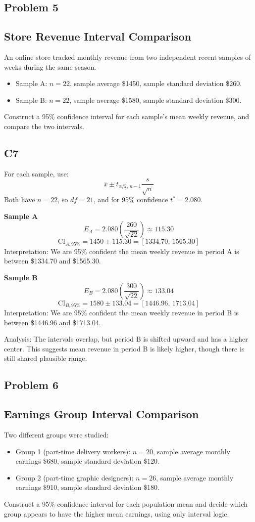 \subsection*{Problem 5}
\subsection*{Store Revenue Interval Comparison}
An online store tracked monthly revenue from two independent recent samples of weeks during the same season.
\begin{itemize}
  \item Sample A: \(n=22\), sample average \$1450, sample standard deviation \$260.
  \item Sample B: \(n=22\), sample average \$1580, sample standard deviation \$300.
\end{itemize}
Construct a 95\% confidence interval for each sample's mean weekly revenue, and compare the two intervals.

\subsection*{C7}
For each sample, use:
\[
\bar{x} \pm t_{\alpha/2,\,n-1}\frac{s}{\sqrt{n}}
\]
Both have \(n=22\), so \(df=21\), and for 95\% confidence \(t^*=2.080\).

\textbf{Sample A}
\[
E_A=2.080\left(\frac{260}{\sqrt{22}}\right)\approx 115.30
\]
\[
\text{CI}_{A,95\%}=1450\pm 115.30=[1334.70,\,1565.30]
\]
Interpretation: We are 95\% confident the mean weekly revenue in period A is between \$1334.70 and \$1565.30.

\textbf{Sample B}
\[
E_B=2.080\left(\frac{300}{\sqrt{22}}\right)\approx 133.04
\]
\[
\text{CI}_{B,95\%}=1580\pm 133.04=[1446.96,\,1713.04]
\]
Interpretation: We are 95\% confident the mean weekly revenue in period B is between \$1446.96 and \$1713.04.

Analysis: The intervals overlap, but period B is shifted upward and has a higher center. This suggests mean revenue in period B is likely higher, though there is still shared plausible range.

\subsection*{Problem 6}
\subsection*{Earnings Group Interval Comparison}
Two different groups were studied:
\begin{itemize}
  \item Group 1 (part-time delivery workers): \(n=20\), sample average monthly earnings \$680, sample standard deviation \$120.
  \item Group 2 (part-time graphic designers): \(n=26\), sample average monthly earnings \$910, sample standard deviation \$180.
\end{itemize}
Construct a 95\% confidence interval for each population mean and decide which group appears to have the higher mean earnings, using only interval logic.

